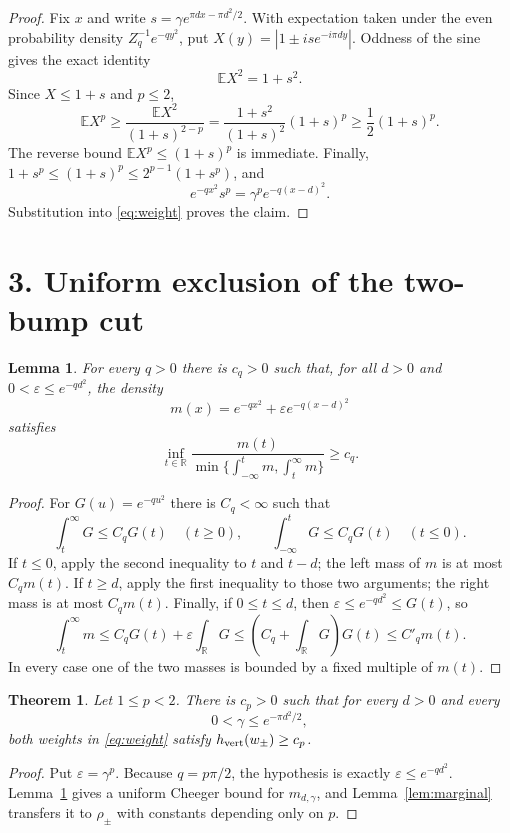 \documentclass[11pt]{article}
\newtheorem{theorem}{Theorem}
\newtheorem{lemma}{Lemma}
\newcommand{\R}{\mathbb R}
\begin{document}
\begin{proof}
Fix $x$ and write $s=\gamma e^{\pi dx-\pi d^2/2}$.  With expectation taken
under the even probability density $Z_q^{-1}e^{-qy^2}$, put
$X(y)=|1\pm is e^{-i\pi dy}|$.  Oddness of the sine gives the exact identity
\[
 \mathbb E X^2=1+s^2.
\]
Since $X\le1+s$ and $p\le2$,
\[
 \mathbb E X^p\ge
 \frac{\mathbb E X^2}{(1+s)^{2-p}}
 =\frac{1+s^2}{(1+s)^2}(1+s)^p
 \ge\frac12(1+s)^p.
\]
The reverse bound $\mathbb E X^p\le(1+s)^p$ is immediate.  Finally,
$1+s^p\le(1+s)^p\le2^{p-1}(1+s^p)$, and
\[
 e^{-qx^2}s^p=\gamma^p e^{-q(x-d)^2}.
\]
Substitution into \eqref{eq:weight} proves the claim.
\end{proof}

\section*{3. Uniform exclusion of the two-bump cut}

\begin{lemma}\label{lem:mixture}
For every $q>0$ there is $c_q>0$ such that, for all $d>0$ and
$0<\varepsilon\le e^{-qd^2}$, the density
\[
 m(x)=e^{-qx^2}+\varepsilon e^{-q(x-d)^2}
\]
satisfies
\[
 \inf_{t\in\R}\frac{m(t)}{
 \min\{\int_{-\infty}^t m,\int_t^\infty m\}}\ge c_q.
\]
\end{lemma}

\begin{proof}
For $G(u)=e^{-qu^2}$ there is $C_q<\infty$ such that
\[
 \int_t^\infty G\le C_qG(t)\quad(t\ge0),
 \qquad
 \int_{-\infty}^tG\le C_qG(t)\quad(t\le0).
\]
If $t\le0$, apply the second inequality to $t$ and $t-d$; the left mass of
$m$ is at most $C_qm(t)$.  If $t\ge d$, apply the first inequality to those
two arguments; the right mass is at most $C_qm(t)$.  Finally, if
$0\le t\le d$, then $\varepsilon\le e^{-qd^2}\le G(t)$, so
\[
 \int_t^\infty m
 \le C_qG(t)+\varepsilon\int_\R G
 \le\left(C_q+\int_\R G\right)G(t)
 \le C'_qm(t).
\]
In every case one of the two masses is bounded by a fixed multiple of
$m(t)$.
\end{proof}

\begin{theorem}\label{thm:main}
Let $1\le p<2$.  There is $c_p>0$ such that for every $d>0$ and every
\[
 0<\gamma\le e^{-\pi d^2/2},
\]
both weights in \eqref{eq:weight} satisfy
$h_{\rm vert}(w_\pm)\ge c_p$.
\end{theorem}

\begin{proof}
Put $\varepsilon=\gamma^p$.  Because $q=p\pi/2$, the hypothesis is exactly
$\varepsilon\le e^{-qd^2}$.  Lemma~\ref{lem:mixture} gives a uniform Cheeger
bound for $m_{d,\gamma}$, and Lemma~\ref{lem:marginal} transfers it to
$\rho_\pm$ with constants depending only on $p$.
\end{proof}
\end{document}
